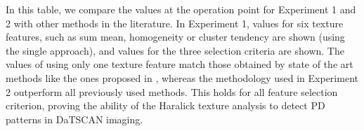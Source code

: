 In this table, we compare the values at the operation point for Experiment 1 and 2 with other methods in the literature. In Experiment 1, values for six texture features, such as sum mean, homogeneity or cluster tendency are shown (using the single approach), and values for the three selection criteria are shown. The values of using only one texture feature match those obtained by state of the art methods like the ones proposed in \cite{Segovia2012,Rojas2012}, whereas the methodology used in Experiment 2 outperform all previously used methods. This holds for all feature selection criterion, proving the ability of the Haralick texture analysis to detect \ac{PD} patterns in DaTSCAN imaging. 
